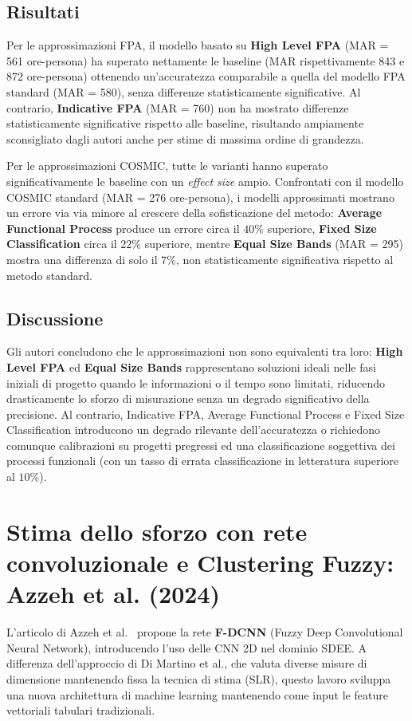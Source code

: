 \documentclass[11pt, a4paper]{article}
\begin{document}
\subsection{Risultati}
Per le approssimazioni FPA, il modello basato su \textbf{High Level FPA} (MAR = 561 ore-persona) ha superato nettamente le baseline (MAR rispettivamente 843 e 872 ore-persona) ottenendo un'accuratezza comparabile a quella del modello FPA standard (MAR = 580), senza differenze statisticamente significative. Al contrario, \textbf{Indicative FPA} (MAR = 760) non ha mostrato differenze statisticamente significative rispetto alle baseline, risultando ampiamente sconsigliato dagli autori anche per stime di massima ordine di grandezza.

Per le approssimazioni COSMIC, tutte le varianti hanno superato significativamente le baseline con un \textit{effect size} ampio. Confrontati con il modello COSMIC standard (MAR = 276 ore-persona), i modelli approssimati mostrano un errore via via minore al crescere della sofisticazione del metodo: \textbf{Average Functional Process} produce un errore circa il $40\%$ superiore, \textbf{Fixed Size Classification} circa il $22\%$ superiore, mentre \textbf{Equal Size Bands} (MAR = 295) mostra una differenza di solo il $7\%$, non statisticamente significativa rispetto al metodo standard.

\subsection{Discussione}
Gli autori concludono che le approssimazioni non sono equivalenti tra loro: \textbf{High Level FPA} ed \textbf{Equal Size Bands} rappresentano soluzioni ideali nelle fasi iniziali di progetto quando le informazioni o il tempo sono limitati, riducendo drasticamente lo sforzo di misurazione senza un degrado significativo della precisione. Al contrario, Indicative FPA, Average Functional Process e Fixed Size Classification introducono un degrado rilevante dell'accuratezza o richiedono comunque calibrazioni su progetti pregressi ed una classificazione soggettiva dei processi funzionali (con un tasso di errata classificazione in letteratura superiore al $10\%$).

\section{Stima dello sforzo con rete convoluzionale e Clustering Fuzzy: Azzeh et al. (2024)}\label{sec:fdcnn}
L'articolo di Azzeh et al.~\cite{article} propone la rete \textbf{F-DCNN} (Fuzzy Deep Convolutional Neural Network), introducendo l'uso delle CNN 2D nel dominio SDEE. A differenza dell'approccio di Di Martino et al., che valuta diverse misure di dimensione mantenendo fissa la tecnica di stima (SLR), questo lavoro sviluppa una nuova architettura di machine learning mantenendo come input le feature vettoriali tabulari tradizionali.
\end{document}
